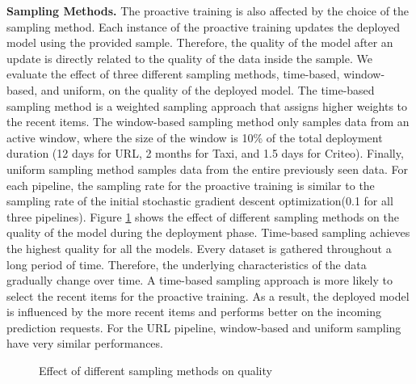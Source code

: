 \textbf{Sampling Methods.}
The proactive training is also affected by the choice of the sampling method.
Each instance of the proactive training updates the deployed model using the provided sample.
Therefore, the quality of the model after an update is directly related to the quality of the data inside the sample.
We evaluate the effect of three different sampling methods, time-based, window-based, and uniform, on the quality of the deployed model.
The time-based sampling method is a weighted sampling approach that assigns higher weights to the recent items. 
The window-based sampling method only samples data from an active window, where the size of the window is 10\% of the total deployment duration (12 days for URL, 2 months for Taxi, and 1.5 days for Criteo).
Finally, uniform sampling method samples data from the entire previously seen data.
For each pipeline, the sampling rate for the proactive training is similar to the sampling rate of the initial stochastic gradient descent optimization(0.1 for all three pipelines).
Figure \ref{sampling-method-figure} shows the effect of different sampling methods on the quality of the model during the deployment phase.
Time-based sampling achieves the highest quality for all the models.
Every dataset is gathered throughout a long period of time.
Therefore, the underlying characteristics of the data gradually change over time.
A time-based sampling approach is more likely to select the recent items for the proactive training.
As a result, the deployed model is influenced by the more recent items and performs better on the incoming prediction requests.
For the URL pipeline, window-based and uniform sampling have very similar performances.

\begin{figure}[!h]
\centering
\resizebox{\columnwidth}{!}{}
\caption{Effect of different sampling methods on quality}
\label{sampling-method-figure}
\end{figure}


